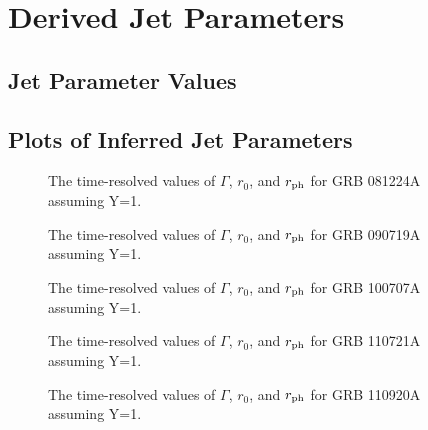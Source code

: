 \chapter{Derived Jet Parameters}
\label{ch:jetParms}

\section{Jet Parameter Values}


















\section{Plots of Inferred Jet Parameters}
\begin{figure}[tp]
  \centering
  \caption{The time-resolved values of $\Gamma$, $r_0$, and $r_{\rm ph}$ for GRB 081224A assuming Y=1.}
  \label{fig:ski1}
\end{figure}


\begin{figure}[tp]
  \centering
  \caption{The time-resolved values of $\Gamma$, $r_0$, and $r_{\rm ph}$ for GRB 090719A assuming Y=1.}
  \label{fig:ski2}
\end{figure}

\begin{figure}[tp]
  \centering
  \caption{The time-resolved values of $\Gamma$, $r_0$, and $r_{\rm ph}$ for GRB 100707A assuming Y=1.}
  \label{fig:ski3}
\end{figure}


\begin{figure}[tp]
  \centering
  \caption{The time-resolved values of $\Gamma$, $r_0$, and $r_{\rm ph}$ for GRB 110721A assuming Y=1.}
  \label{fig:ski4}
\end{figure}


\begin{figure}[tp]
  \centering
  \caption{The time-resolved values of $\Gamma$, $r_0$, and $r_{\rm ph}$ for GRB 110920A assuming Y=1.}
  \label{fig:ski5}
\end{figure}

